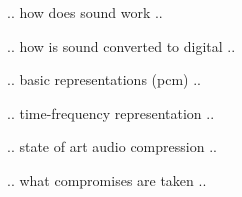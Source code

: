 .. how does sound work ..

.. how is sound converted to digital ..

.. basic representations (pcm) ..

.. time-frequency representation ..

.. state of art audio compression ..

.. what compromises are taken ..

